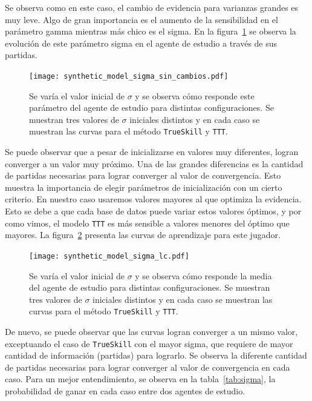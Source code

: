 \documentclass[11pt,twoside, spanish]{report} %
\begin{document}
Se observa como en este caso, el cambio de evidencia para varianzas grandes es muy leve.
Algo de gran importancia es el aumento de la sensibilidad en el par\'ametro gamma mientras m\'as chico es el sigma.
En la figura~\ref{fig:sigma}  se observa la evoluci\'on de este par\'ametro sigma en el agente de estudio a trav\'es de sus partidas.

\begin{figure}[H]
	\centering
	\texttt{[image: synthetic\_model\_sigma\_sin\_cambios.pdf]}
    \caption{Se var\'ia el valor inicial de $\sigma$ y se observa c\'omo responde este par\'ametro del agente de estudio para distintas configuraciones. Se muestran tres valores de $\sigma$ iniciales distintos y en cada caso se muestran las curvas para el m\'etodo \texttt{TrueSkill} y \texttt{TTT}.}
	\label{fig:sigma}
\end{figure}


Se puede observar que a pesar de inicializarse en valores muy diferentes, logran converger a un valor muy pr\'oximo.
Una de las grandes diferencias es la cantidad de partidas necesarias para lograr converger al valor de convergencia.
Esto muestra la importancia de elegir par\'ametros de inicializaci\'on con un cierto criterio.
En nuestro caso usaremos valores mayores al que optimiza la evidencia.
Esto se debe a que cada base de datos puede variar estos valores \'optimos, y por como vimos, el modelo \texttt{TTT} es m\'as sensible a valores menores del \'optimo que mayores.
La figura~\ref{fig:sigma_lc} presenta las curvas de aprendizaje para este jugador.

\begin{figure}[H]
	\centering
	\texttt{[image: synthetic\_model\_sigma\_lc.pdf]}
	\caption{Se var\'ia el valor inicial de $\sigma$ y se observa c\'omo responde la media del agente de estudio para distintas configuraciones. Se muestran tres valores de $\sigma$ iniciales distintos y en cada caso se muestran las curvas para el m\'etodo \texttt{TrueSkill} y \texttt{TTT}.}
	\label{fig:sigma_lc}
\end{figure}

De nuevo, se puede observar que las curvas logran converger a un mismo valor, exceptuando el caso de \texttt{TrueSkill} con el mayor sigma, que requiere de mayor cantidad de informaci\'on (partidas) para lograrlo.
Se observa la diferente cantidad de partidas necesarias para lograr converger al valor de convergencia en cada caso.
Para un mejor entendimiento, se observa en la tabla~\ref{tab:sigma}, la probabilidad de ganar en cada caso entre dos agentes de estudio.
\end{document}
